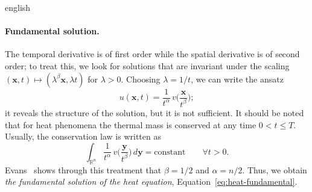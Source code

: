 \documentclass[0000.tex]{subfiles}
\begin{document}
\begin{hyphenrules}{english}
\paragraph{Fundamental solution.}
The temporal derivative is of first order while the spatial derivative is of second order; to treat
this, we look for solutions that are invariant under the scaling $(\mathbf{x},t)\mapsto(\lambda^{\beta}\mathbf{x},\lambda t)$
for $\lambda>0$. Choosing $\lambda=1/t$, we can write the ansatz
\begin{equation}
  u(\mathbf{x},t)=\frac{1}{t^{\alpha}}\,v\Big(\frac{\mathbf{x}}{t^{\beta}}\Big);
  \label{eq:heat-ansatz}
\end{equation}
it reveals the structure of the solution, but it is not sufficient. It should be noted that for heat
phenomena the thermal mass is conserved at any time $0<t\le T$. Usually, the conservation law is
written as
\begin{equation}
  \int_{\mathbb{R}^n}\frac{1}{t^{\alpha}}\,v\Big(\frac{\mathbf{y}}{t^{\beta}}\Big)\,d\mathbf{y}=\text{constant}\qquad\forall t>0.
  \label{eq:heat-mass}
\end{equation}
Evans~\cite{evans2010} shows through this treatment that $\beta=1/2$ and $\alpha=n/2$. Thus, we obtain
\emph{the fundamental solution of the heat equation}, Equation~\eqref{eq:heat-fundamental}.


\end{hyphenrules}
\end{document}
